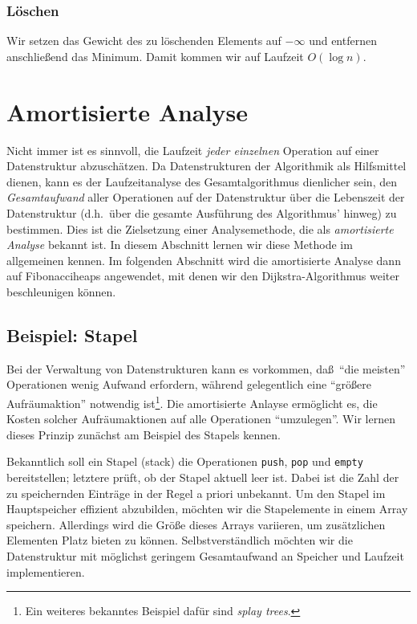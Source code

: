 \documentclass[10pt,reqno]{amsart}
\numberwithin{equation}{section}
\begin{document}
\subsubsection{L\"oschen}
Wir setzen das Gewicht des zu l\"oschenden Elements auf $-\infty$ und entfernen anschlie\ss end das Minimum.
Damit kommen wir auf Laufzeit $O(\log n)$.

\section{Amortisierte Analyse}\label{sec_amor}

Nicht immer ist es sinnvoll, die Laufzeit {\em jeder einzelnen} Operation auf einer Datenstruktur abzusch\"atzen.
Da Datenstrukturen der Algorithmik als Hilfsmittel dienen, kann es der Laufzeitanalyse des Gesamtalgorithmus dienlicher sein, den {\em Gesamtaufwand} aller Operationen auf der Datenstruktur \"uber die Lebenszeit der Datenstruktur (d.h.\ \"uber die gesamte Ausf\"uhrung des Algorithmus' hinweg) zu bestimmen.
Dies ist die Zielsetzung einer Analysemethode, die als {\em amortisierte Analyse} bekannt ist.
In diesem Abschnitt lernen wir diese Methode im allgemeinen kennen.
Im folgenden Abschnitt wird die amortisierte Analyse dann auf Fibonacciheaps angewendet, mit denen wir den Dijkstra-Algorithmus weiter beschleunigen k\"onnen.

\subsection{Beispiel: Stapel}\label{sec_amor_stack}

Bei der Verwaltung von Datenstrukturen kann es vorkommen, da\ss\ ``die meisten'' Operationen wenig Aufwand erfordern, w\"ahrend gelegentlich eine ``gr\"o\ss ere Aufr\"aumaktion'' notwendig ist\footnote{Ein weiteres bekanntes Beispiel daf\"ur sind {\em splay trees}.}.
Die amortisierte Anlayse erm\"oglicht es, die Kosten solcher Aufr\"aumaktionen auf alle Operationen ``umzulegen''.
Wir lernen dieses Prinzip zun\"achst am Beispiel des Stapels kennen.

Bekanntlich soll ein Stapel (stack) die Operationen {\tt push}, {\tt pop} und {\tt empty} bereitstellen; letztere pr\"uft, ob der Stapel aktuell leer ist.
Dabei ist die Zahl der zu speichernden Eintr\"age in der Regel a priori unbekannt.
Um den Stapel im Hauptspeicher effizient abzubilden, m\"ochten wir die Stapelemente in einem Array speichern.
Allerdings wird die Gr\"o\ss e dieses Arrays variieren, um zus\"atzlichen Elementen Platz bieten zu k\"onnen.
Selbstverst\"andlich m\"ochten wir die Datenstruktur mit m\"oglichst geringem Gesamtaufwand an Speicher und Laufzeit implementieren.
\end{document}
